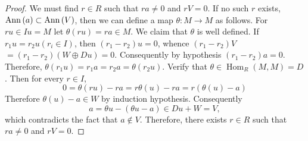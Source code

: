 \begin{lemma}
\begin{proof}
        We must find $r \in R$ such that $r a \neq 0$ and $r V=0$. If no such $r$ exists, $\operatorname{\operatorname{Ann}}\left( a \right)\subset\operatorname{\operatorname{Ann}}\left( V\right)$, then we can define a map
        $\theta: M \rightarrow M$
        as follows.
        For $r u \in I u=M$ let $\theta(r u)=r a \in M$.
        We claim that $\theta$ is well defined.
        If $r_1 u=r_2 u\left(r_i \in I\right)$, then $\left(r_1-r_2\right) u=0$, whence $\left(r_1-r_2\right) V$ $=\left(r_1-r_2\right)(W \oplus D u)=0$. Consequently by hypothesis $\left(r_1-r_2\right) a=0$.
        Therefore, $\theta\left(r_1 u\right)=r_1 a=r_2 a=\theta\left(r_2 u\right)$.
        Verify that $\theta \in \operatorname{Hom}_R(M, M)=D$.
        Then for every $r \in I$,
        \begin{equation*}
            0=\theta(r u)-r a=r \theta(u)-r a=r(\theta(u)-a)
        \end{equation*}
        Therefore $\theta(u)-a \in W$ by induction hypothesis.
        Consequently
        \begin{equation*}
            a=\theta u-(\theta u-a) \in D u+W=V,
        \end{equation*}
        which contradicts the fact that $a \not \in V$.
        Therefore, there exists $r \in R$ such that $r a \neq 0$ and $r V=0$.
    \end{proof}
\end{lemma}

